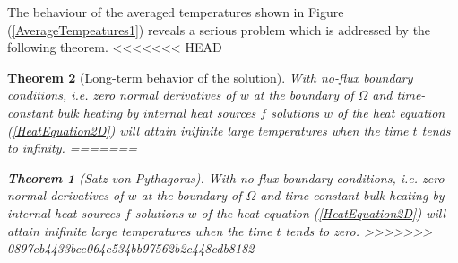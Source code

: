 \documentclass[a4paper,11pt]{article}
\theoremstyle{plain} %
\newtheorem{theorem}{Theorem}[section]
\theoremstyle{definition} %
\theoremstyle{remark} %
\def\uTemp{u}
\def\uTemp{w}
\begin{document}
The behaviour of the averaged temperatures shown in Figure (\ref{AverageTempeatures1}) reveals a serious problem which is addressed by the following theorem.
<<<<<<< HEAD
\begin{theorem}[Long-term behavior of the solution]
With no-flux boundary conditions, i.e. zero normal derivatives of $\uTemp $ at the boundary of $\Omega $ and time-constant bulk heating by internal heat sources $f$ solutions $\uTemp $ of the heat equation (\ref{HeatEquation2D}) will attain inifinite large temperatures when the time $t$ tends to infinity.
=======
\begin{theorem}[Satz von Pythagoras]
With no-flux boundary conditions, i.e. zero normal derivatives of $\uTemp $ at the boundary of $\Omega $ and time-constant bulk heating by internal heat sources $f$ solutions $\uTemp $ of the heat equation (\ref{HeatEquation2D}) will attain inifinite large temperatures when the time $t$ tends to zero.
>>>>>>> 0897cb4433bce064c534bb97562b2c448cdb8182
\end{theorem}


\end{theorem}
\end{document}
